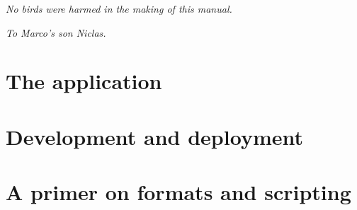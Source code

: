 \documentclass[a4paper,oneside,12pt]{memoir}
\begin{document}
\cleardoublepage

\vspace*{25em}

\begin{flushright}
\em No birds were harmed in the making of this manual.
\end{flushright}




\printunsrtglossary

\cleardoublepage

\vspace*{25em}

\thispagestyle{empty}
\begin{flushright}
\em To Marco's son Niclas.
\end{flushright}

\cleardoublepage

\tableofcontents*

\cleardoublepage

\mainmatter



\part{The application}
\label{part:application}








\part{Development and deployment}
\label{part:developmentanddeployment}




\part{A primer on formats and scripting}
\label{part:primer}



\end{document}
